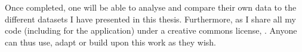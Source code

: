 Once completed, one will be able to analyse and compare their own data
to the different datasets I have presented in this thesis.
Furthermore, as I share all my code (including for the application)
under a creative commons license,
.
Anyone can thus use, adapt or build upon this work as they wish.\mybr\


%
%
%
%
%
%
%


